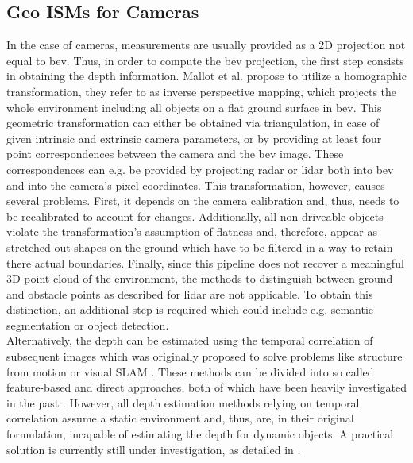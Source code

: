 \subsection{Geo ISMs for Cameras}
\label{subsec:geo_ism_camera}
In the case of cameras, measurements are usually provided as a 2D projection not equal to \gls{bev}. Thus, in order to compute the \gls{bev} projection, the first step consists in obtaining the depth information. Mallot et al. \cite{mallot1991inverse} propose to utilize a homographic transformation, they refer to as inverse perspective mapping, which projects the whole environment including all objects on a flat ground surface in \gls{bev}. This geometric transformation can either be obtained via triangulation, in case of given intrinsic and extrinsic camera parameters, or by providing at least four point correspondences between the camera and the \gls{bev} image. These correspondences can e.g. be provided by projecting radar or lidar both into \gls{bev} and into the camera's pixel coordinates. This transformation, however, causes several problems. First, it depends on the camera calibration and, thus, needs to be recalibrated to account for changes. Additionally, all non-driveable objects violate the transformation's assumption of flatness and, therefore, appear as stretched out shapes on the ground which have to be filtered in a way to retain there actual boundaries. Finally, since this pipeline does not recover a meaningful 3D point cloud of the environment, the methods to distinguish between ground and obstacle points as described for lidar are not applicable. To obtain this distinction, an additional step is required which could include e.g. semantic segmentation or object detection.\\
%
Alternatively, the depth can be estimated using the temporal correlation of subsequent images which was originally proposed to solve problems like structure from motion \cite{longuet1981computer} or visual SLAM \cite{davison2007monoslam}. These methods can be divided into so called feature-based and direct approaches, both of which have been heavily investigated in the past \cite{ma2020image}. However, all depth estimation methods relying on temporal correlation assume a static environment and, thus, are, in their original formulation, incapable of estimating the depth for dynamic objects. A practical solution is currently still under investigation, as detailed in \cite{saputra2018visual}.\\ 
%
